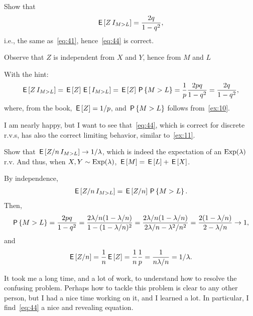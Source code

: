 \documentclass[a4paper,11pt]{article}
\begin{document}
\begin{exercise}
Show that 
\begin{equation}
  \label{eq:45}
\E{Z\1{M>L}} = \frac{2q} {1-q^{2}},
\end{equation}
i.e., the same as~\cref{eq:41}, hence~\cref{eq:44} is correct.
\begin{hint}
Observe that $Z$   is independent from $X$ and $Y$, hence from $M$ and $L$
\end{hint}
\begin{solution} With the hint:
  \begin{align}
    \label{eq:46}
\E{Z\1{M>L}}  = \E Z \E{\1{M>L}} = \E Z \P{M>L} = \frac 1 p \frac{2pq}{1-q^{2}} = \frac{2q}{1-q^{2}},
  \end{align}
where, from the book, $\E Z = 1/p$, and $\P{M>L}$ follows from~\cref{ex:10}. 
\end{solution}
\end{exercise}


I am nearly happy, but I want to see that~\eqref{eq:44}, which is correct for discrete r.v.s, has also the correct limiting behavior, similar to~\cref{ex:11}. 
\begin{exercise}
Show that $\E{Z/n\1{M>L}} \to 1/\lambda$, which is indeed the expectation of an $\Exp{\lambda}$ r.v. And thus, when $X,Y\sim \Exp{\lambda}$, $\E M = \E L + \E X$.
\begin{solution}
By independence,
  \begin{align}
    \label{eq:47}
\E{Z/n\1{M>L}} = \E{Z/n} \P{M>L}. 
  \end{align}
Then,
\begin{align}
  \label{eq:49}
\P{M>L}   = \frac{2pq}{1-q^{2}} 
= \frac{2\lambda/n (1-\lambda/n)}{1-(1-\lambda/n)^{2}} 
= \frac{2\lambda/n (1-\lambda/n)}{2\lambda/n -\lambda^{2}/n^{2}}  
= \frac{2 (1-\lambda/n)}{2 -\lambda/n}  \to 1,
\end{align}
and
\begin{align}
  \label{eq:50}
\E{Z/n} = \frac 1 n \E Z = \frac 1 n \frac 1 p = \frac 1 {n \lambda/ n} = 1/\lambda.
\end{align}
\end{solution}

\end{exercise}

It took me a long time, and a lot of work, to understand how to resolve the confusing problem.
Perhaps how to tackle this problem is clear to any other person, but I had a nice time working on it, and I learned a lot.
In particular, I find~\cref{eq:44} a nice and revealing equation.
\end{document}
